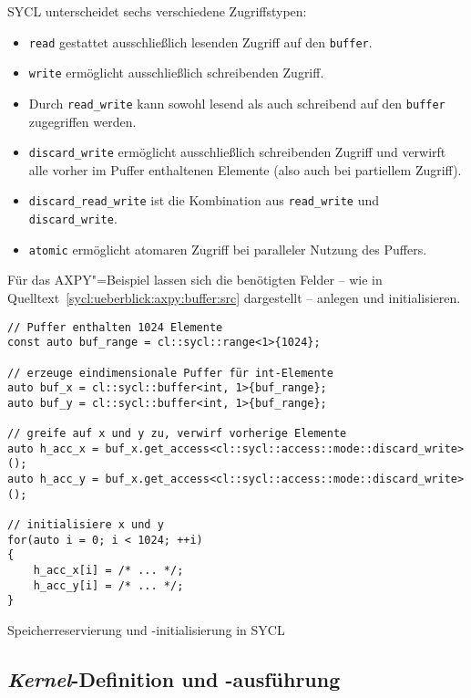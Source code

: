 SYCL unterscheidet sechs verschiedene Zugriffstypen:
\begin{itemize}
    \item \texttt{read} gestattet ausschließlich lesenden Zugriff auf den
          \texttt{buffer}.
    \item \texttt{write} ermöglicht ausschließlich schreibenden Zugriff.
    \item Durch \texttt{read\_write} kann sowohl lesend als auch schreibend
          auf den \texttt{buffer} zugegriffen werden.
    \item \texttt{discard\_write} ermöglicht ausschließlich schreibenden Zugriff
          und verwirft alle vorher im Puffer enthaltenen Elemente (also auch bei
          partiellem Zugriff).
    \item \texttt{discard\_read\_write} ist die Kombination aus
          \texttt{read\_write} und \texttt{discard\_write}.
    \item \texttt{atomic} ermöglicht atomaren Zugriff bei paralleler Nutzung des
          Puffers.
\end{itemize}

Für das AXPY"=Beispiel lassen sich die benötigten Felder -- wie in
Quelltext~\ref{sycl:ueberblick:axpy:buffer:src} dargestellt -- anlegen und
initialisieren.
%
\begin{code}
    \begin{verbatim}
// Puffer enthalten 1024 Elemente
const auto buf_range = cl::sycl::range<1>{1024};

// erzeuge eindimensionale Puffer für int-Elemente
auto buf_x = cl::sycl::buffer<int, 1>{buf_range};
auto buf_y = cl::sycl::buffer<int, 1>{buf_range};

// greife auf x und y zu, verwirf vorherige Elemente
auto h_acc_x = buf_x.get_access<cl::sycl::access::mode::discard_write>();
auto h_acc_y = buf_x.get_access<cl::sycl::access::mode::discard_write>();

// initialisiere x und y
for(auto i = 0; i < 1024; ++i)
{
    h_acc_x[i] = /* ... */;
    h_acc_y[i] = /* ... */;
}
    \end{verbatim}
    \caption{Speicherreservierung und -initialisierung in SYCL}
    \label{sycl:ueberblick:axpy:buffer:src}
\end{code}

\subsection{\textit{Kernel}-Definition und -ausführung}
\label{sycl:ueberblick:axpy:kernel}

